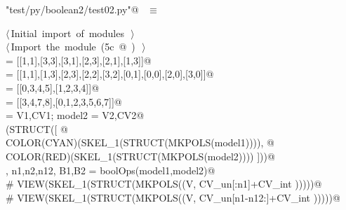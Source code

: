 \documentclass[11pt,oneside]{article}	%
\begin{document}
\begin{flushleft} \small
\begin{minipage}{\linewidth} \label{scrap8}
\verb@"test/py/boolean2/test02.py"@\nobreak\ {\footnotesize {} }$\equiv$
\vspace{-1ex}
\begin{list}{}{} \item
\mbox{}\verb@@\hbox{$\langle\,$Initial import of modules\nobreak\ {\footnotesize {}}$\,\rangle$}\verb@@\\
\mbox{}\verb@@\hbox{$\langle\,$Import the module\nobreak\ ({\footnotesize 5c\label{scrap9}
 }\mbox{}@ ) {\footnotesize {}}$\,\rangle$}\verb@@\\
\mbox{} = [[1,1],[3,3],[3,1],[2,3],[2,1],[1,3]]@\\
\mbox{} = [[1,1],[1,3],[2,3],[2,2],[3,2],[0,1],[0,0],[2,0],[3,0]]@\\
\mbox{} = [[0,3,4,5],[1,2,3,4]]@\\
\mbox{} = [[3,4,7,8],[0,1,2,3,5,6,7]]@\\
\mbox{} = V1,CV1; model2 = V2,CV2@\\
\mbox{}\verb@VIEW(STRUCT([ @\\
\mbox{}\verb@   COLOR(CYAN)(SKEL_1(STRUCT(MKPOLS(model1)))), @\\
\mbox{}\verb@   COLOR(RED)(SKEL_1(STRUCT(MKPOLS(model2)))) ]))@\\
\mbox{}\verb@V, n1,n2,n12, B1,B2 = boolOps(model1,model2)@\\
\mbox{}\verb@# VIEW(SKEL_1(STRUCT(MKPOLS((V, CV_un[:n1]+CV_int )))))@\\
\mbox{}\verb@# VIEW(SKEL_1(STRUCT(MKPOLS((V, CV_un[n1-n12:]+CV_int )))))@\\
\mbox{}\verb@@{\NWsep}
\end{list}
\vspace{-2ex}
\end{minipage}\\[4ex]
\end{flushleft}
\end{document}
